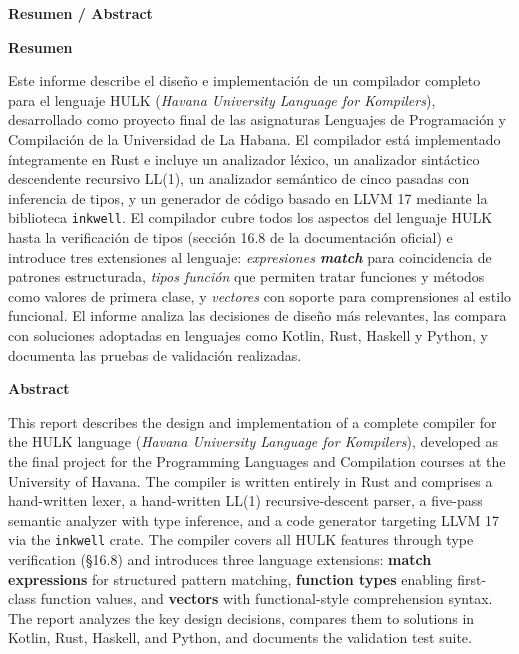 \documentclass[12pt, a4paper]{article}
\begin{document}
\thispagestyle{empty}
\vspace*{1cm}

\begin{center}
    {\Large\bfseries Resumen / Abstract}
\end{center}

\vspace{1em}

\noindent\textbf{Resumen}

\vspace{0.5em}

\noindent
Este informe describe el diseño e implementación de un compilador completo para el
lenguaje HULK (\textit{Havana University Language for Kompilers}), desarrollado como
proyecto final de las asignaturas Lenguajes de Programación y Compilación de la
Universidad de La Habana. El compilador está implementado íntegramente en Rust e incluye
un analizador léxico, un analizador sintáctico descendente recursivo LL(1), un
analizador semántico de cinco pasadas con inferencia de tipos, y un generador de
código basado en LLVM 17 mediante la biblioteca \texttt{inkwell}. El compilador cubre
todos los aspectos del lenguaje HULK hasta la verificación de tipos (sección 16.8 de
la documentación oficial) e introduce tres extensiones al lenguaje: \textit{expresiones
\textbf{match}} para coincidencia de patrones estructurada, \textit{tipos función} que
permiten tratar funciones y métodos como valores de primera clase, y \textit{vectores}
con soporte para comprensiones al estilo funcional. El informe analiza las decisiones
de diseño más relevantes, las compara con soluciones adoptadas en lenguajes como
Kotlin, Rust, Haskell y Python, y documenta las pruebas de validación realizadas.

\vspace{1.5em}

\noindent\textbf{Abstract}

\vspace{0.5em}

\noindent
This report describes the design and implementation of a complete compiler for the
HULK language (\textit{Havana University Language for Kompilers}), developed as the
final project for the Programming Languages and Compilation courses at the University
of Havana. The compiler is written entirely in Rust and comprises a hand-written lexer,
a hand-written LL(1) recursive-descent parser, a five-pass semantic analyzer with
type inference, and a code generator targeting LLVM 17 via the \texttt{inkwell} crate.
The compiler covers all HULK features through type verification (§16.8) and introduces
three language extensions: \textbf{match expressions} for structured pattern matching,
\textbf{function types} enabling first-class function values, and \textbf{vectors}
with functional-style comprehension syntax. The report analyzes the key design
decisions, compares them to solutions in Kotlin, Rust, Haskell, and Python, and
documents the validation test suite.
\end{document}
